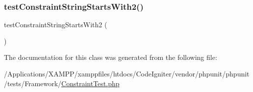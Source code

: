 \mbox{\label{class_framework___constraint_test_aeeb7d77edf2c8a8e390286d24be9d8b2}} 
\subsubsection{\texorpdfstring{test\+Constraint\+String\+Starts\+With2()}{testConstraintStringStartsWith2()}}
{\footnotesize\ttfamily test\+Constraint\+String\+Starts\+With2 (\begin{DoxyParamCaption}{ }\end{DoxyParamCaption})}



The documentation for this class was generated from the following file\+:\begin{DoxyCompactItemize}
\item 
/\+Applications/\+X\+A\+M\+P\+P/xamppfiles/htdocs/\+Code\+Igniter/vendor/phpunit/phpunit/tests/\+Framework/\mbox{\hyperlink{_constraint_test_8php}{Constraint\+Test.\+php}}\end{DoxyCompactItemize}
